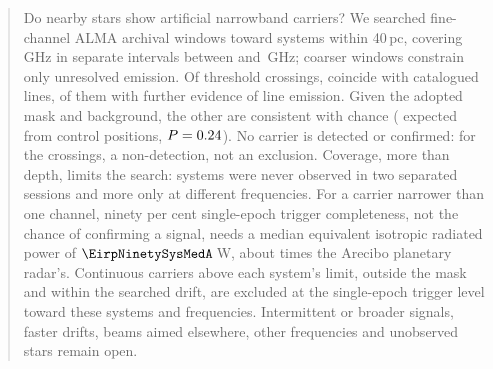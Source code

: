 \begin{abstract}
Do nearby stars show artificial narrowband carriers? We searched \NWinA{} fine-channel ALMA archival windows toward
\NSysClassA{} systems within 40\,pc, covering \CvUnionA\,GHz in
\CovNIslands{} separate intervals between \SurvFreqLoA{} and
\SurvFreqHiA\,GHz; \NWinB{} coarser windows constrain only unresolved
emission. Of \CsNCross{} threshold crossings, \MkNCoinc{}
coincide with catalogued lines, \LnAttrSupp{} of them with further
evidence of line emission. Given the adopted mask and background, the
other \CeObs{} are consistent with chance (\CeExp{} expected from control
positions, $P=\CeProbNull$). No carrier is detected or confirmed: for the
crossings, a non-detection, not an exclusion. Coverage, more than depth,
limits the search: \ZcNoRepNoSep{} systems were never observed in two separated
sessions and \ZcNoRepNoFreqWord{} more only at different frequencies. For a carrier narrower than one channel, ninety per cent
single-epoch trigger completeness, not the chance of confirming a signal,
needs a median equivalent isotropic radiated power of
$\EirpNinetySysMedA$\,W, about \AroMedMult{} times the Arecibo planetary radar's. Continuous
carriers above each system's limit, outside the mask and within
the searched drift, are excluded at the single-epoch trigger level toward these
systems and frequencies. Intermittent or broader signals, faster
drifts, beams aimed elsewhere, other frequencies and unobserved stars
remain open.
\end{abstract}


